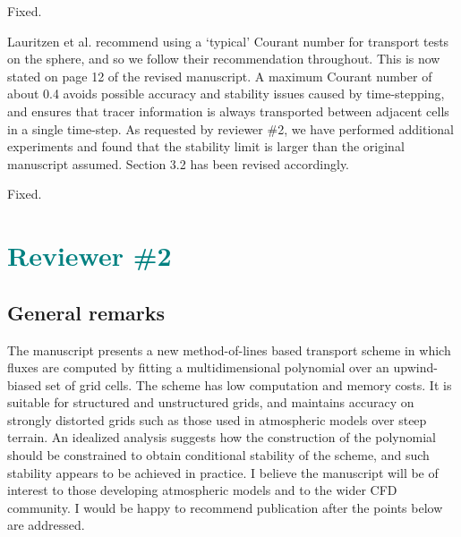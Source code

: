 \documentclass[times]{elsarticle}
\newcommand{\revtwo}[1]{\textcolor{teal}{\textbf{#1}}}
\begin{document}
\begin{quotation}
\begin{comment}
\item p.12, caption of Fig. 6, last but one sentence: "domain is
    shown" instead of "domain in shown".
\end{comment}
\end{quotation}
Fixed.

\begin{quotation}
\begin{comment}
\item Section 3: Why are most of the experiments run with maximum CFL
    numbers < 0.5 or even < 0.4, although the cubic-fit scheme
    permits a maximum CFL < 1 (Fig. 10)? Is this because the upwind
    scheme, to which cubic-fit is compared to, is more limited with
    respect to the time step for the considered test cases?
\end{comment}
\end{quotation}
Lauritzen et al. \citep{lauritzen2012} recommend using a `typical' Courant number for transport tests on the sphere, and so we follow their recommendation throughout.  This is now stated on page 12 of the revised manuscript.
A maximum Courant number of about 0.4 avoids possible accuracy and stability issues caused by time-stepping, and ensures that tracer information is always transported between adjacent cells in a single time-step.
As requested by reviewer \#2, we have performed additional experiments and found that the stability limit is larger than the original manuscript assumed.  Section 3.2 has been revised accordingly.

\begin{quotation}
\begin{comment}
\item p. 18, last but one paragraph, last sentence: correct "imprintingin".
\end{comment}
\end{quotation}
Fixed.


\section*{\revtwo{Reviewer \#2}}

\subsection*{General remarks}

The manuscript presents a new method-of-lines based transport scheme
in which fluxes are computed by fitting a multidimensional
polynomial over an upwind-biased set of grid cells. The scheme
has low computation and memory costs. It is suitable for
structured and unstructured grids, and maintains accuracy
on strongly distorted grids such as those used in atmospheric models
over steep terrain. An idealized analysis suggests how the
construction of the polynomial should be constrained to obtain
conditional stability of the scheme, and such stability appears
to be achieved in practice.
I believe the manuscript will be of interest to those developing
atmospheric models and to the wider CFD community. I would be happy to
recommend publication after the points below are addressed.
\end{document}
